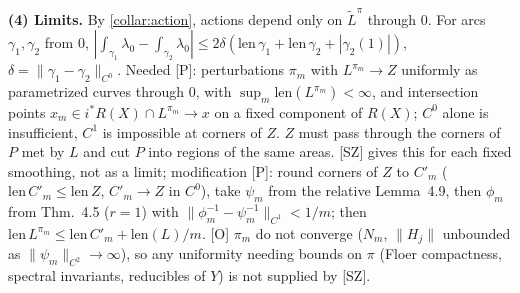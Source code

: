 \smallskip\noindent\textbf{(4) Limits.} By \eqref{collar:action}, actions depend only on $\tilde L^\pi$ through $0$. For arcs
$\gamma_1,\gamma_2$ from $0$, $|\int_{\gamma_1}\lambda_0-\int_{\gamma_2}\lambda_0|\le2\delta(\mathrm{len}\,\gamma_1+\mathrm{len}\,\gamma_2+|\gamma_2(1)|)$,
$\delta=\|\gamma_1-\gamma_2\|_{C^0}$. Needed [P]: perturbations $\pi_m$ with $L^{\pi_m}\to Z$ uniformly as
parametrized curves through $0$, with $\sup_m\mathrm{len}(L^{\pi_m})<\infty$, and intersection points
$x_m\in i^*R(X)\cap L^{\pi_m}\to x$ on a fixed component of $R(X)$; $C^0$ alone is insufficient, $C^1$ is
impossible at corners of $Z$. $Z$ must pass through the corners of $P$ met by $L$ and cut $P$ into
regions of the same areas. [SZ] gives this for each fixed smoothing, not as a limit; modification [P]: round
corners of $Z$ to $C'_m$ ($\mathrm{len}\,C'_m\le\mathrm{len}\,Z$, $C'_m\to Z$ in $C^0$), take $\psi_m$ from the relative
Lemma~4.9, then $\phi_m$ from Thm.~4.5 ($r=1$) with $\|\phi_m^{-1}-\psi_m^{-1}\|_{C^1}<1/m$; then
$\mathrm{len}\,L^{\pi_m}\le\mathrm{len}\,C'_m+\mathrm{len}(L)/m$. [O] $\pi_m$ do not converge ($N_m$, $\|H_j\|$ unbounded as
$\|\psi_m\|_{C^2}\to\infty$), so any uniformity needing bounds on $\pi$ (Floer compactness, spectral invariants,
reducibles of $Y$) is not supplied by [SZ].
